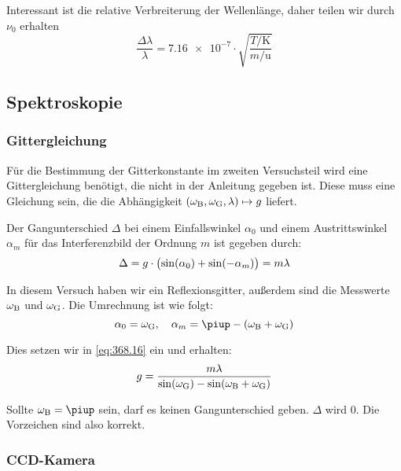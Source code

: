 Interessant ist die relative Verbreiterung der Wellenlänge, daher teilen wir
durch $\nu_0$ erhalten
\begin{equation}
    \label{eq:dopplerverbreiterung}
    \frac{\Delta\lambda}\lambda = \num{7.16e-7} \cdot
    \sqrt{\frac{T/\si\kelvin}{m/\si\atomicmassunit}}
\end{equation}

\subsection{Spektroskopie}

\subsubsection{Gittergleichung}

Für die Bestimmung der Gitterkonstante im zweiten Versuchsteil wird eine
Gittergleichung benötigt, die nicht in der Anleitung gegeben ist. Diese muss
eine Gleichung sein, die die Abhängigkeit $(\omega_\text B, \omega_\text G,
\lambda) \mapsto g$ liefert.

Der Gangunterschied $\Delta$ bei einem Einfallswinkel $\alpha_0$ und einem
Austrittswinkel $\alpha_m$ für das Interferenzbild der Ordnung $m$ ist gegeben
durch: \parencite[Formel~368.16]{physik312-Anleitung}
\begin{equation}
    \label{eq:368.16}
    \Delta = g \cdot \del{\sin(\alpha_0) + \sin(-\alpha_m)} = m \lambda
\end{equation}

In diesem Versuch haben wir ein Reflexionsgitter, außerdem sind die Messwerte
$\omega_\text B$ und $\omega_\text G$. Die Umrechnung ist wie folgt:
\[
    \alpha_0 = \omega_\text G
    \eqnsep
    \alpha_m = \piup - \del{ \omega_\text B + \omega_\text G }
\]

Dies setzen wir in \eqref{eq:368.16} ein und erhalten:
\begin{equation}
    \label{eq:gittergleichung}
    g = \frac{m \lambda}{\sin(\omega_\text G) - \sin(\omega_\text B + \omega_\text G)}
\end{equation}

Sollte $\omega_\text B = \piup$ sein, darf es keinen Gangunterschied geben.
$\Delta$ wird 0. Die Vorzeichen sind also korrekt.

\subsubsection{CCD-Kamera}

